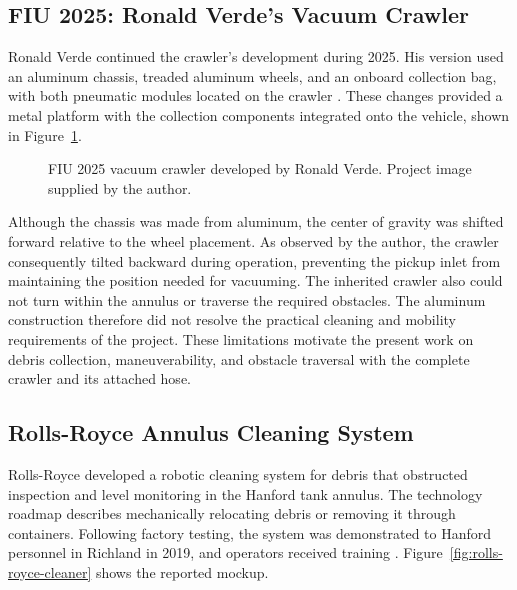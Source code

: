 \subsection{FIU 2025: Ronald Verde's Vacuum Crawler}
\label{sec:fiu-2025-crawler}
Ronald Verde continued the crawler's development during 2025. His version used an aluminum chassis, treaded aluminum wheels, and an onboard collection bag, with both pneumatic modules located on the crawler \citep{verde2025Crawler}. These changes provided a metal platform with the collection components integrated onto the vehicle, shown in Figure~\ref{fig:ronald-crawler}.

\begin{figure}[H]
\centering
{}
\caption[FIU 2025 vacuum crawler: Ronald Verde]{FIU 2025 vacuum crawler developed by Ronald Verde. Project image supplied by the author.}
\label{fig:ronald-crawler}
\end{figure}

Although the chassis was made from aluminum, the center of gravity was shifted forward relative to the wheel placement. As observed by the author, the crawler consequently tilted backward during operation, preventing the pickup inlet from maintaining the position needed for vacuuming. The inherited crawler also could not turn within the annulus or traverse the required obstacles. The aluminum construction therefore did not resolve the practical cleaning and mobility requirements of the project. These limitations motivate the present work on debris collection, maneuverability, and obstacle traversal with the complete crawler and its attached hose.



\subsection{Rolls-Royce Annulus Cleaning System}
\label{sec:rolls-royce-cleaner}
Rolls-Royce developed a robotic cleaning system for debris that obstructed inspection and level monitoring in the Hanford tank annulus. The technology roadmap describes mechanically relocating debris or removing it through containers. Following factory testing, the system was demonstrated to Hanford personnel in Richland in 2019, and operators received training \citep{hanford2022AnnulusCleaner}. Figure~\ref{fig:rolls-royce-cleaner} shows the reported mockup.

